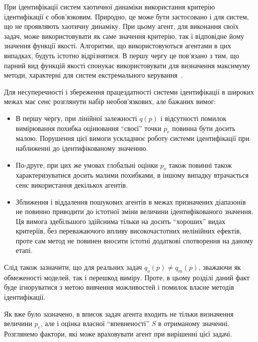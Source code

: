 При ідентифікації систем хаотичної динаміки використання
критерію ідентифікації є обов'язковим. Природно, це може
бути застосовано і для систем, що не проявляють хаотичну
динаміку. При цьому агент, для виконання своїх задач, може
використовувати як саме значення критерію, так і відповідне
йому значення функції якості. Алгоритми, що використовуються
агентами в цих випадках, будуть істотно відрізнятися. В першу
чергу це пов'язано з тим, що парний вид функцій якості спонукає
використовувати для визначення максимуму методи, характерні
для систем екстремального керування~\cite{rastr_seu}.

Для несуперечності і збереження працездатності системи
ідентифікації в широких межах має сенс розглянути набір
необов'язкових, але бажаних вимог:

\begin{itemize}

  \item
    В першу чергу, при лінійної залежності
    $q(p)$ і відсутності помилок вимірювання похибка оцінювання
    ``своєї'' точки
    $p_e$ повинна бути досить малою. Порушення цієї вимоги
    ускладнює роботу системи ідентифікації при наближенні до
    ідентифікованому значенню.

  \item
    По-друге, при цих же умовах глобальні оцінки
    $ p_o $ також повинні також характеризуватися досить малими
    похибками, в іншому випадку втрачається сенс використання
    декількох агентів.

  \item
    Зближення і віддалення пошукових агентів в межах призначених
    діапазонів не повинно приводити до істотної зміни величини
    ідентифікованого значення. Ця вимога здебільшого здійснима
    тільки на досить ``хороших'' видах критеріїв, без переважаючого
    впливу високочастотних нелінійних ефектів, проте сам метод не
    повинен вносити істотні додаткові спотворення на даному етапі.

\end{itemize}

Слід також зазначити, що для реальних задач
$ q_o (p) \ne q_m (p) $, зважаючи як обмеженості моделей, так і перешкод
виміру. Проте, в цьому розділі даний факт буде ігноруватися
з метою вивчення можливостей і помилок власне методів
ідентифікації.




Як вже було зазначено, в вписок задач агента входить не тільки
визначення величини
$ p_e $, але і оцінка власної ``впевненості''
$ S $ в отриманому значенні. Розглянемо фактори, які може враховувати
агент при вирішенні цієї задачі.

